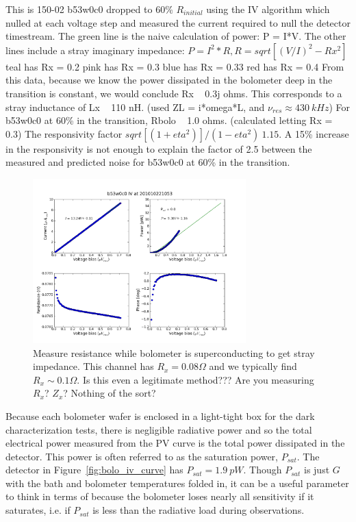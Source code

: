 This is 150-02 b53w0c0 dropped to 60\% $R_{initial}$ using the IV algorithm which nulled at each voltage step and measured the current required to null the detector timestream.
The green line is the naive calculation of power: P = I*V.
The other lines include a stray imaginary impedance: $P = I^2*R, R = sqrt[(V/I)^2 - Rx^2]$
teal has Rx = 0.2
pink has Rx = 0.3
blue has Rx = 0.33
red has Rx = 0.4
From this data, because we know the power dissipated in the bolometer deep in the transition is constant, we would conclude Rx ~ 0.3j ohms.
This corresponds to a stray inductance of Lx ~ 110 nH. (used ZL = i*omega*L, and $\nu_{res} \approx 430~kHz$)
For b53w0c0 at 60\% in the transition, Rbolo ~ 1.0 ohms. (calculated letting Rx = 0.3)
The responsivity factor $sqrt[(1+eta^2)]/(1-eta^2) ~ 1.15$.
A 15\% increase in the responsivity is not enough to explain the factor of 2.5 between the measured and predicted noise for b53w0c0 at 60\% in the transition.

\begin{figure}[htbp]
\begin{center}
\includegraphics[height=2.5in]{figures/b53w0c0_IV_latched.png} 
\caption{Measure resistance while bolometer is superconducting to get stray impedance. This channel has $R_{x} = 0.08 \Omega$ and we typically find $R_{x} \sim 0.1 \Omega$. Is this even a legitimate method??? Are you measuring $R_{x}$? $Z_{x}$? Nothing of the sort?
\label{fig:latched_iv_curve} }
\end{center}
\end{figure}



Because each bolometer wafer is enclosed in a light-tight box for the dark characterization tests, there is negligible radiative power and so the total electrical power measured from the PV curve is the total power dissipated in the detector. 
This power is often referred to as the saturation power, $P_{sat}$. 
The detector in Figure~\ref{fig:bolo_iv_curve} has $P_{sat} = 1.9~pW$.
Though $P_{sat}$ is just $G$ with the bath and bolometer temperatures folded in, it can be a useful parameter to think in terms of because the bolometer loses nearly all sensitivity if it saturates, i.e. if $P_{sat}$ is less than the radiative load during observations. 

